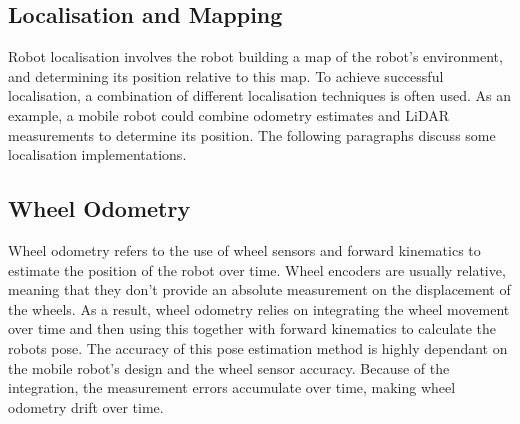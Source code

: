 




\subsection{Localisation and Mapping}\label{sec:T:AN:Localisation}
Robot localisation involves the robot building a map of the robot's environment, and determining its position relative to this map\cite{SiegwartRoland2011Itam}.  To achieve successful localisation, a combination of different localisation techniques is often used. As an example, a mobile robot could combine odometry estimates and LiDAR measurements to determine its position. The following paragraphs discuss some localisation implementations.


\subsection{Wheel Odometry}
Wheel odometry refers to the use of wheel sensors and forward kinematics to estimate the position of the robot over time. Wheel encoders are usually relative, meaning that they don't provide an absolute measurement on the displacement of the wheels. As a result, wheel odometry relies on integrating the wheel movement over time and then using this together with forward kinematics to calculate the robots pose. The accuracy of this pose estimation method is highly dependant on the mobile robot's design and the wheel sensor accuracy. Because of the integration, the measurement errors accumulate over time, making wheel odometry drift over time. %

